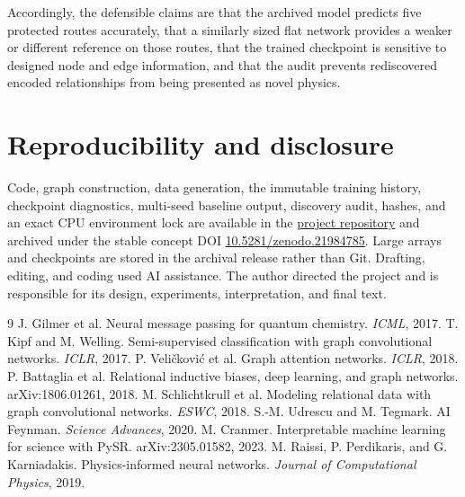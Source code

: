 \documentclass[10pt]{article}
\begin{document}
Accordingly, the defensible claims are that the archived model predicts five protected routes accurately, that a similarly sized flat network provides a weaker or different reference on those routes, that the trained checkpoint is sensitive to designed node and edge information, and that the audit prevents rediscovered encoded relationships from being presented as novel physics.

\section*{Reproducibility and disclosure}

Code, graph construction, data generation, the immutable training history, checkpoint diagnostics, multi-seed baseline output, discovery audit, hashes, and an exact CPU environment lock are available in the
\href{https://github.com/mi99at/physics-gnn-symbolic-discovery}{project repository}
and archived under the stable concept DOI
\href{https://doi.org/10.5281/zenodo.21984785}{10.5281/zenodo.21984785}.
Large arrays and checkpoints are stored in the archival release rather than Git. Drafting, editing, and coding used AI assistance. The author directed the project and is responsible for its design, experiments, interpretation, and final text.

\begin{thebibliography}{9}\footnotesize
\setlength{\itemsep}{1pt}
 J. Gilmer et al. Neural message passing for quantum chemistry. \emph{ICML}, 2017.
 T. Kipf and M. Welling. Semi-supervised classification with graph convolutional networks. \emph{ICLR}, 2017.
 P. Veli\v{c}kovi\'c et al. Graph attention networks. \emph{ICLR}, 2018.
 P. Battaglia et al. Relational inductive biases, deep learning, and graph networks. arXiv:1806.01261, 2018.
 M. Schlichtkrull et al. Modeling relational data with graph convolutional networks. \emph{ESWC}, 2018.
 S.-M. Udrescu and M. Tegmark. AI Feynman. \emph{Science Advances}, 2020.
 M. Cranmer. Interpretable machine learning for science with PySR. arXiv:2305.01582, 2023.
 M. Raissi, P. Perdikaris, and G. Karniadakis. Physics-informed neural networks. \emph{Journal of Computational Physics}, 2019.
\end{thebibliography}
\end{document}
